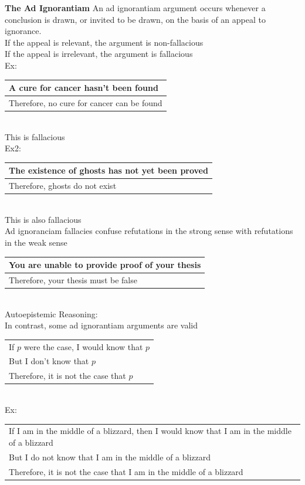 \documentclass[11pt, fleqn]{article}
\begin{document}
\textbf{The Ad Ignorantiam}
An ad ignorantiam argument occurs whenever a conclusion is drawn, or invited to be drawn, on the basis of an appeal to ignorance.\\
If the appeal is relevant, the argument is non-fallacious\\
If the appeal is irrelevant, the argument is fallacious\\

Ex:\\
\begin{tabular}{p{8cm}}
    A cure for cancer hasn't been found\\
    \hline
    Therefore, no cure for cancer can be found
\end{tabular}\\
This is fallacious\\
Ex2:\\
\begin{tabular}{p{8cm}}
    The existence of ghosts has not yet been proved\\
    \hline
    Therefore, ghosts do not exist
\end{tabular}\\
This is also fallacious\\

Ad ignoranciam fallacies confuse refutations in the strong sense with refutations in the weak sense\\
\begin{tabular}{p{8cm}}
    You are unable to provide proof of your thesis\\
    \hline
    Therefore, your thesis must be false
\end{tabular}\\

Autoepistemic Reasoning:\\
In contrast, some ad ignorantiam arguments are valid\\
\begin{tabular}{p{8cm}}
    If $p$ were the case, I would know that $p$\\
    But I don't know that $p$\\
    \hline
    Therefore, it is not the case that $p$
\end{tabular}\\
Ex:\\
\begin{tabular}{p{16cm}}
    If I am in the middle of a blizzard, then I would know that I am in the middle of a blizzard\\
    But I do not know that I am in the middle of a blizzard\\
    \hline
    Therefore, it is not the case that I am in the middle of a blizzard
\end{tabular}\\
\end{document}
